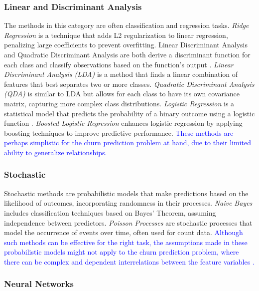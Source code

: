 \subsubsection{Linear and Discriminant Analysis}

The methods in this category are often classification and regression tasks. \textit{Ridge Regression} is a technique that adds L2 regularization to linear regression, penalizing large coefficients to prevent overfitting. Linear Discriminant Analysis and Quadratic Discriminant Analysis are both derive a discriminant function for each class and classify observations based on the function's output \cite{tharwat2016linear}. \textit{Linear Discriminant Analysis (LDA)} is a method that finds a linear combination of features that best separates two or more classes. \textit{Quadratic Discriminant Analysis (QDA)} is similar to LDA but allows for each class to have its own covariance matrix, capturing more complex class distributions. \textit{Logistic Regression} is a statistical model that predicts the probability of a binary outcome using a logistic function \cite{hosmer2013applied}. \textit{Boosted Logistic Regression} enhances logistic regression by applying boosting techniques to improve predictive performance. \textcolor{blue}{These methods are perhaps simplistic for the churn prediction problem at hand, due to their limited ability to generalize relationships.}

\subsubsection{Stochastic} 
Stochastic methods are probabilistic models that make predictions based on the likelihood of outcomes, incorporating randomness in their processes. \textit{Naive Bayes} \cite{gladence2015statistical} includes classification techniques based on Bayes' Theorem, assuming independence between predictors. \textit{Poisson Processes} \cite{kingman1992poisson} are stochastic processes that model the occurrence of events over time, often used for count data. \textcolor{blue}{Although such methods can be effective for the right task, the assumptions made in these probabilistic models might not apply to the churn prediction problem, where there can be complex and dependent interrelations between the feature variables \cite{sahami1996learning}.} 

\subsubsection{Neural Networks}

